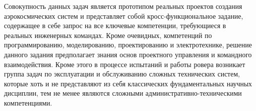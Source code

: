 Совокупность данных задач является прототипом реальных проектов создания аэрокосмических систем и представляет собой кросс-функциональное задание, содержащее в себе запрос на все ключевые компетенции, требующиеся в реальных инженерных командах. Кроме очевидных, компетенций по программированию, моделированию, проектированию и электротехнике, решение данного задания предполагает знания основ проектного управления и командного взаимодействия. Кроме этого в процессе испытаний и работы ровера возникает группа задач по эксплуатации и обслуживанию сложных технических систем, которые хоть и не представляют из себя классических фундаментальных научных дисциплин, тем не менее являются сложными административно-техническими компетенциями.